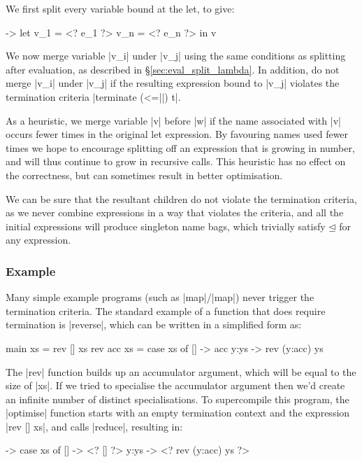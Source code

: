 \documentclass[draft]{sigplanconf}
\begin{document}
We first split every variable bound at the let, to give:

\begin{code}
\free ->  let  v_1 = <? e_1 ?>
               v_n = <? e_n ?>
          in   v
\end{code}

We now merge variable |v_i| under |v_j| using the same conditions as splitting after evaluation, as described in \S\ref{sec:eval_split_lambda}. In addition, do not merge |v_i| under |v_j| if the resulting expression bound to |v_j| violates the termination criteria |terminate (<=||) t|.

As a heuristic, we merge variable |v| before |w| if the name associated with |v| occurs fewer times in the original let expression. By favouring names used fewer times we hope to encourage splitting off an expression that is growing in number, and will thus continue to grow in recursive calls. This heuristic has no effect on the correctness, but can sometimes result in better optimisation.

We can be sure that the resultant children do not violate the termination criteria, as we never combine expressions in a way that violates the criteria, and all the initial expressions will produce singleton name bags, which trivially satisfy $\unlhd$ for any expression.

\subsubsection{Example}
\label{sec:term_example}

Many simple example programs (such as |map|/|map|) never trigger the termination criteria. The standard example of a function that does require termination is |reverse|, which can be written in a simplified form as:

\begin{code}
main xs = rev [] xs
rev acc xs = case  xs of
                   []    -> acc
                   y:ys  -> rev (y:acc) ys
\end{code}

The |rev| function builds up an accumulator argument, which will be equal to the size of |xs|. If we tried to specialise the accumulator argument then we'd create an infinite number of distinct specialisations. To supercompile this program, the |optimise| function starts with an empty termination context and the expression |rev [] xs|, and calls |reduce|, resulting in:

\begin{code}
\xs -> case  xs of
             []    -> <? [] ?>
             y:ys  -> <? rev (y:acc) ys ?>
\end{code}
\end{document}
